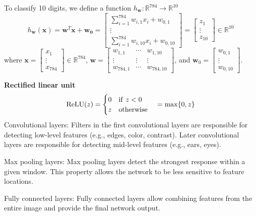 \documentclass[11pt]{amsart}
\begin{document}
To classify 10 digits, we define a function $h_{\mathbf{w}}: \mathbb{R}^{784} \to \mathbb{R}^{10}$
$$
h_\mathbf{w}(\mathbf{x}) = \mathbf{w}^T \mathbf{x} + \bm{w_0} = \left[\begin{array}{c}\sum_{i=1}^{784} w_{i,1} x_i + w_{0,1}\\\vdots\\\sum_{i=1}^{784} w_{i, 10} x_i + w_{0,10}\end{array}\right]= \left[\begin{array}{c}z_1\\\vdots\\z_{10} \end{array}\right]\in \mathbb{R}^{10}
$$
where $\mathbf{x}=\left[\begin{array}{c}x_1\\\vdots\\x_{784}\end{array}\right]\in \mathbb{R}^{784}$, $\mathbf{w}=\left[\begin{array}{ccc}w_{1,1}&\cdots&w_{1,10}\\\vdots&\vdots&\vdots\\w_{784,1}&\cdots&w_{784,10}\end{array}\right]$, and $\mathbf{w}_0=\left[\begin{array}{c}w_{0,1}\\\vdots\\w_{0,10}\end{array}\right]$.
\medskip

{\bf Rectified linear unit}
$$
{\rm ReLU}(z)=\begin{cases} 0 \quad {\rm if} \,\,  z<0\\
z \quad {\rm otherwise}\end{cases}={\rm max}\{0, z\}
$$
\noindent
Convolutional layers: Filters in the first convolutional layers are responsible for detecting low-level features (e.g., edges, color, contrast). Later convolutional layers are responsible for detecting mid-level features (e.g., ears, eyes).
\medskip

\noindent
Max pooling layers: Max pooling layers detect the strongest response within a given window. This property allows the network to be less sensitive to feature locations.
\medskip

\noindent
Fully connected layers: Fully connected layers allow combining features from the entire image and provide the final network output.
\medskip
\end{document}
